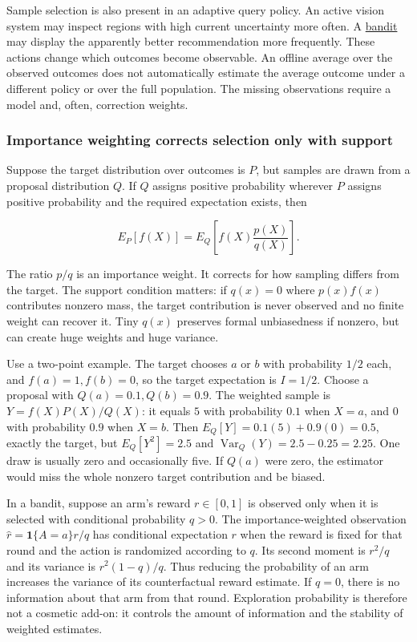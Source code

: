 Sample selection is also present in an adaptive query policy. An active vision system may inspect regions with high current uncertainty more often. A \hyperref[appendix-3dc863dbddf3]{bandit} may display the apparently better recommendation more frequently. These actions change which outcomes become observable. An offline average over the observed outcomes does not automatically estimate the average outcome under a different policy or over the full population. The missing observations require a model and, often, correction weights.

\subsubsection{Importance weighting corrects selection only with support}\label{importance-weighting-corrects-selection-only-with-support}

Suppose the target distribution over outcomes is \(P\), but samples are drawn from a proposal distribution \(Q\). If \(Q\) assigns positive probability wherever \(P\) assigns positive probability and the required expectation exists, then

\[
E_P[f(X)]=E_Q\left[f(X)\frac{p(X)}{q(X)}\right].
\]

The ratio \(p/q\) is an importance weight. It corrects for how sampling differs from the target. The support condition matters: if \(q(x)=0\) where \(p(x)f(x)\) contributes nonzero mass, the target contribution is never observed and no finite weight can recover it. Tiny \(q(x)\) preserves formal unbiasedness if nonzero, but can create huge weights and huge variance.

Use a two-point example. The target chooses \(a\) or \(b\) with probability \(1/2\) each, and \(f(a)=1,f(b)=0\), so the target expectation is \(I=1/2\). Choose a proposal with \(Q(a)=0.1,Q(b)=0.9\). The weighted sample is \(Y=f(X)P(X)/Q(X)\): it equals \(5\) with probability \(0.1\) when \(X=a\), and \(0\) with probability \(0.9\) when \(X=b\). Then \(E_Q[Y]=0.1(5)+0.9(0)=0.5\), exactly the target, but \(E_Q[Y^2]=2.5\) and \(\operatorname{Var}_Q(Y)=2.5-0.25=2.25\). One draw is usually zero and occasionally five. If \(Q(a)\) were zero, the estimator would miss the whole nonzero target contribution and be biased.

In a bandit, suppose an arm's reward \(r\in[0,1]\) is observed only when it is selected with conditional probability \(q>0\). The importance-weighted observation \(\hat r=\mathbf 1\{A=a\}r/q\) has conditional expectation \(r\) when the reward is fixed for that round and the action is randomized according to \(q\). Its second moment is \(r^2/q\) and its variance is \(r^2(1-q)/q\). Thus reducing the probability of an arm increases the variance of its counterfactual reward estimate. If \(q=0\), there is no information about that arm from that round. Exploration probability is therefore not a cosmetic add-on: it controls the amount of information and the stability of weighted estimates.

